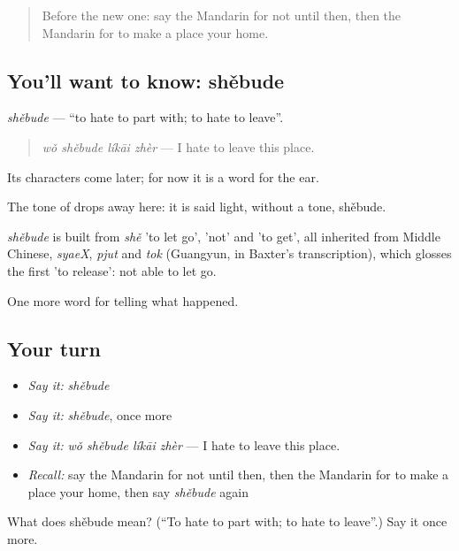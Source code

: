 \label{lesson:ZH-C313-shebude}



\begin{quote}
Before the new one: say the Mandarin for not until then, then the Mandarin for to make a place your home.
\end{quote}

\subsection*{You'll want to know: shěbude}
\emph{shěbude} — \textquotedblleft{}to hate to part with; to hate to leave\textquotedblright{}.

\begin{quote}
\emph{wǒ shěbude líkāi zhèr} — I hate to leave this place.
\end{quote}

Its characters come later; for now it is a word for the ear.

The tone of  drops away here: it is said light, without a tone, shěbude.

\begin{cousinweb}
\emph{shěbude} is built from \emph{shě} 'to let go',  'not' and  'to get', all inherited from Middle Chinese, \emph{syaeX}, \emph{pjut} and \emph{tok} (Guangyun, in Baxter's transcription), which glosses the first 'to release': not able to let go.
\end{cousinweb}

\begin{grammarlens}[title={What you've built}]
One more word for telling what happened.
\end{grammarlens}

\subsection*{Your turn}
\begin{itemize}
\raggedright
  \item \emph{Say it:} \emph{shěbude}
  \item \emph{Say it:} \emph{shěbude}, once more
  \item \emph{Say it:} \emph{wǒ shěbude líkāi zhèr} — I hate to leave this place.
  \item \emph{Recall:} say the Mandarin for not until then, then the Mandarin for to make a place your home, then say \emph{shěbude} again
\end{itemize}

\begin{tcolorbox}[breakable,colback=teal!4,colframe=teal!35!black,title={Before you move on}]
What does shěbude mean? (\textquotedblleft{}To hate to part with; to hate to leave\textquotedblright{}.) Say it once more.
\end{tcolorbox}
